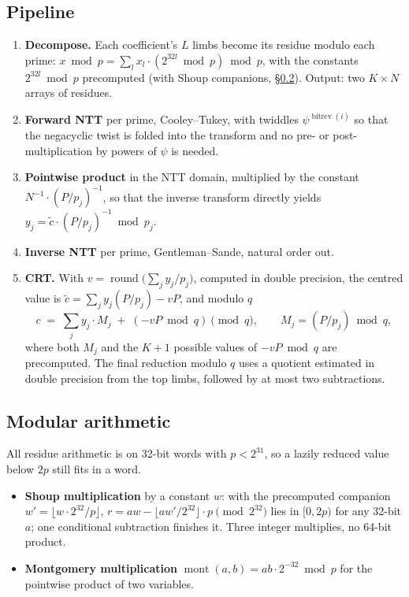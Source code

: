 \documentclass[11pt,a4paper]{article}
\newcommand{\bitrev}{\operatorname{bitrev}}
\begin{document}
\subsection{Pipeline}
\begin{enumerate}[leftmargin=*]
\item \textbf{Decompose.} Each coefficient's $L$ limbs become its residue modulo each
  prime: $x \bmod p = \sum_{l} x_l \cdot (2^{32l} \bmod p) \bmod p$, with the
  constants $2^{32l} \bmod p$ precomputed (with Shoup companions,
  \S\ref{sec:shoup}). Output: two $K \times N$ arrays of residues.
\item \textbf{Forward NTT} per prime, Cooley--Tukey, with twiddles
  $\psi^{\bitrev(i)}$ so that the negacyclic twist is folded into the transform and
  no pre- or post-multiplication by powers of $\psi$ is needed.
\item \textbf{Pointwise product} in the NTT domain, multiplied by the constant
  $N^{-1} \cdot (P/p_j)^{-1}$, so that the inverse transform directly yields
  $y_j = \tilde c \cdot (P/p_j)^{-1} \bmod p_j$.
\item \textbf{Inverse NTT} per prime, Gentleman--Sande, natural order out.
\item \textbf{CRT.} With $v = \operatorname{round}\big(\sum_j y_j / p_j\big)$,
  computed in double precision, the centred value is
  $\tilde c = \sum_j y_j (P/p_j) - vP$, and modulo $q$
  \[
    c \;=\; \sum_j y_j \cdot M_j \;+\; (-vP \bmod q) \pmod q,
    \qquad M_j = (P/p_j) \bmod q,
  \]
  where both $M_j$ and the $K+1$ possible values of $-vP \bmod q$ are precomputed.
  The final reduction modulo $q$ uses a quotient estimated in double precision from
  the top limbs, followed by at most two subtractions.
\end{enumerate}

\subsection{Modular arithmetic}\label{sec:shoup}
All residue arithmetic is on 32-bit words with $p < 2^{31}$, so a lazily reduced
value below $2p$ still fits in a word.
\begin{itemize}[leftmargin=*]
\item \textbf{Shoup multiplication} by a constant $w$: with the precomputed
  companion $w' = \lfloor w \cdot 2^{32} / p \rfloor$,
  $r = a w - \lfloor a w' / 2^{32} \rfloor \cdot p \pmod{2^{32}}$ lies in $[0, 2p)$
  for any 32-bit $a$; one conditional subtraction finishes it. Three integer
  multiplies, no 64-bit product.
\item \textbf{Montgomery multiplication} $\operatorname{mont}(a,b) = a b \cdot 2^{-32} \bmod p$
  for the pointwise product of two variables.
\end{itemize}
\end{document}
